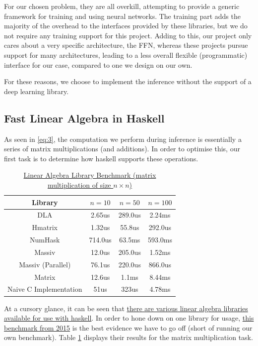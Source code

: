 \documentclass[12pt, titlepage]{article}
\begin{document}
For our chosen problem, they are all overkill, attempting to provide a generic framework for training and using neural networks. The training part adds the majority of the overhead to the interfaces provided by these libraries, but we do not require any training support for this project. Adding to this, our project only cares about a very specific architecture, the FFN, whereas these projects pursue support for many architectures, leading to a less overall flexible (programmatic) interface for our case, compared to one we design on our own.\bigskip

For these reasons, we choose to implement the inference without the support of a deep learning library.

\subsection{Fast Linear Algebra in Haskell}
As seen in \eqref{eq:3}, the computation we perform during inference is essentially a series of matrix multiplications (and additions). In order to optimise this, our first task is to determine how haskell supports these operations.\bigskip

\begin{table}
	\centering \begin{tabular}{|c|c|c|c|}
		\hline \textbf{Library} & $n = 10$ & $n = 50$ & $n = 100$\\
		\hline DLA & 2.65us & 289.0us & 2.24ms\\
		\hline Hmatrix & 1.32us & 55.8us & 292.0us\\
		\hline NumHask & 714.0us & 63.5ms & 593.0ms\\
		\hline Massiv & 12.0us & 205.0us & 1.52ms\\
		\hline Massiv (Parallel) & 76.1us & 220.0us & 866.0us\\
		\hline Matrix & 12.6us & 1.1ms & 8.44ms\\
		\hline Naive C Implementation & 51us & 323us & 4.78ms\\
		\hline
	\end{tabular}
	\caption{\label{tab:1} \href{https://github.com/Magalame/fastest-matrices}{Linear Algebra Library Benchmark (matrix multiplication of size $n \times n$)}}
\end{table}
At a cursory glance, it can be seen that \href{https://wiki.haskell.org/Applications_and_libraries/Mathematics#Linear_algebra}{there are various linear algebra libraries available for use with haskell}. In order to hone down on one library for usage, \href{https://github.com/Magalame/fastest-matrices}{this benchmark from 2015} is the best evidence we have to go off (short of running our own benchmark). Table \ref{tab:1} displays their results for the matrix multiplication task.\bigskip
\end{document}
